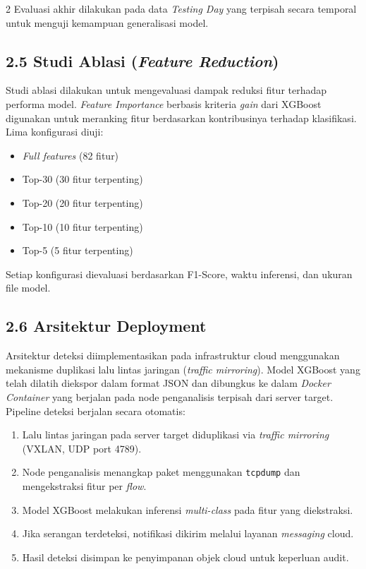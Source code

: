 \documentclass[10pt,a4paper]{article}
\begin{document}
\begin{multicols}{2}
Evaluasi akhir dilakukan pada data \textit{Testing Day} yang terpisah secara temporal untuk menguji kemampuan generalisasi model.

\subsection*{2.5 Studi Ablasi (\textit{Feature Reduction})}

Studi ablasi dilakukan untuk mengevaluasi dampak reduksi fitur terhadap performa model. \textit{Feature Importance} berbasis kriteria \textit{gain} dari XGBoost digunakan untuk meranking fitur berdasarkan kontribusinya terhadap klasifikasi. Lima konfigurasi diuji:
\begin{itemize}
\item \textit{Full features} (82 fitur)
\item Top-30 (30 fitur terpenting)
\item Top-20 (20 fitur terpenting)
\item Top-10 (10 fitur terpenting)
\item Top-5 (5 fitur terpenting)
\end{itemize}

Setiap konfigurasi dievaluasi berdasarkan F1-Score, waktu inferensi, dan ukuran file model.

\subsection*{2.6 Arsitektur Deployment}

Arsitektur deteksi diimplementasikan pada infrastruktur cloud menggunakan mekanisme duplikasi lalu lintas jaringan (\textit{traffic mirroring}). Model XGBoost yang telah dilatih diekspor dalam format JSON dan dibungkus ke dalam \textit{Docker Container} yang berjalan pada node penganalisis terpisah dari server target. Pipeline deteksi berjalan secara otomatis:

\begin{enumerate}
\item Lalu lintas jaringan pada server target diduplikasi via \textit{traffic mirroring} (VXLAN, UDP port 4789).
\item Node penganalisis menangkap paket menggunakan \texttt{tcpdump} dan mengekstraksi fitur per \textit{flow}.
\item Model XGBoost melakukan inferensi \textit{multi-class} pada fitur yang diekstraksi.
\item Jika serangan terdeteksi, notifikasi dikirim melalui layanan \textit{messaging} cloud.
\item Hasil deteksi disimpan ke penyimpanan objek cloud untuk keperluan audit.
\end{enumerate}


\end{multicols}
\end{document}
